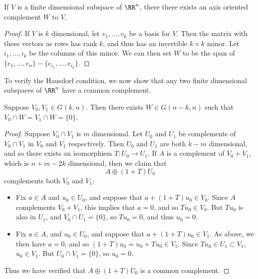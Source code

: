 \begin{lemma}
    If $V$ is a finite dimensional subspace of $\RR^n$, there there exists an axis oriented complement $W$ to $V$.
\end{lemma}
\begin{proof}
    If $V$ is $k$ dimensional, let $v_1,\dots,v_k$ be a basis for $V$. Then the matrix with these vectors as rows has rank $k$, and thus has an invertible $k \times k$ minor. Let $i_1,\dots,i_k$ be the columns of this minor. We can then set $W$ to be the span of $\{ e_1, \dots, e_n \} - \{ e_{i_1}, \dots, e_{i_k} \}$.
\end{proof}

To verify the Hausdorf condition, we now show that any two finite dimensional subspaces of $\RR^n$ have a common complement.

\begin{lemma}
    Suppose $V_0,V_1 \in G(k,n)$. Then there exists $W \in G(n-k,n)$ such that $V_0 \cap W = V_1 \cap W = \{ 0 \}$.
\end{lemma}
\begin{proof}
    Suppose $V_0 \cap V_1$ is $m$ dimensional. Let $U_0$ and $U_1$ be complements of $V_0 \cap V_1$ in $V_0$ and $V_1$ respectively. Then $U_0$ and $U_1$ are both $k - m$ dimensional, and so there exists an isomorphism $T: U_0 \to U_1$. If $A$ is a complement of $V_0 + V_1$, which is $n + m - 2k$ dimensional, then we claim that
    \[ A \oplus (1 + T) U_0 \]
    complements both $V_0$ and $V_1$:
    \begin{itemize}
        \item Fix $a \in A$ and $u_0 \in U_0$, and suppose that $a + (1 + T) u_0 \in V_0$. Since $A$ complements $V_0 + V_1$, this implies that $a = 0$, and so $Tu_0 \in V_0$. But $Tu_0$ is also in $U_1$, and $V_0 \cap U_1 = \{ 0 \}$, so $Tu_0 = 0$, and thus $u_0 = 0$.

        \item Fix $a \in A$, and $u_0 \in U_0$, and suppose that $a + (1 + T) u_0 \in V_1$. As above, we then have $a = 0$, and so $(1 + T) u_0 = u_0 + Tu_0 \in V_1$. Since $Tu_0 \in U_1 \subset V_1$, $u_0 \in V_1$. But $U_0 \cap V_1 = \{ 0 \}$, so $u_0 = 0$.
    \end{itemize}
    Thus we have verified that $A \oplus (1 + T) U_0$ is a common complement.
\end{proof}

